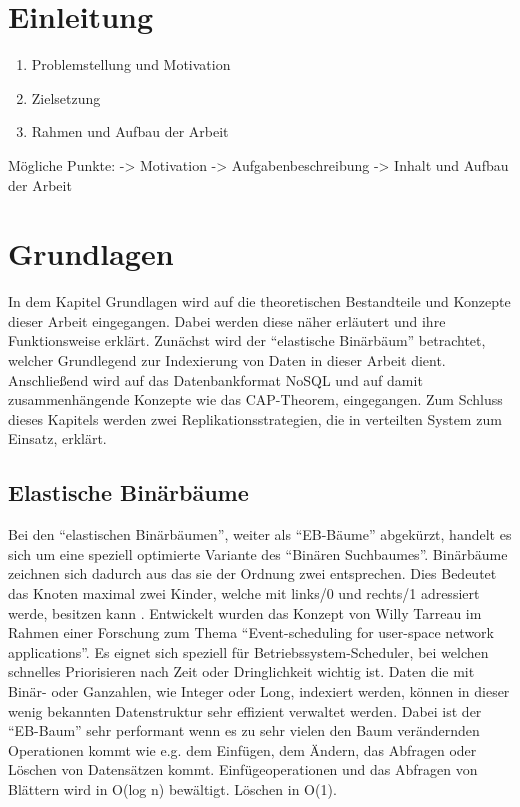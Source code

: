 \documentclass[a4paper,11pt,oneside,%
headsepline,												%
footsepline,												%
bibtotocnumbered									%
]{scrreprt}
\begin{document}
\chapter{Einleitung}
 		\begin{enumerate}[1.]
			\item  Problemstellung und Motivation
			\item Zielsetzung
			\item Rahmen und Aufbau der Arbeit
		\end{enumerate}
		
	Mögliche Punkte:
	-> Motivation
	-> Aufgabenbeschreibung
	-> Inhalt und Aufbau der Arbeit	
		
\chapter{Grundlagen}

In dem Kapitel Grundlagen wird auf die theoretischen Bestandteile und Konzepte dieser Arbeit eingegangen. Dabei werden diese näher erläutert und ihre Funktionsweise erklärt.
Zunächst wird der \enquote{elastische Binärbäum} betrachtet, welcher Grundlegend zur Indexierung von Daten in dieser Arbeit dient. Anschließend wird auf das Datenbankformat NoSQL und auf damit zusammenhängende Konzepte wie das CAP-Theorem, eingegangen. Zum Schluss dieses Kapitels werden zwei Replikationsstrategien, die in verteilten System zum Einsatz, erklärt.   

\section{Elastische Binärbäume}
\label{sec:ebTreeGrundlagen}
Bei den \enquote{elastischen Binärbäumen}, weiter als \enquote{EB-Bäume} abgekürzt, handelt es sich um eine speziell optimierte Variante des \enquote{Binären Suchbaumes}. Binärbäume zeichnen sich dadurch aus das sie der Ordnung zwei entsprechen. Dies Bedeutet das Knoten maximal zwei Kinder, welche mit links/0 und rechts/1 adressiert werde, besitzen kann \autocite[251]{Ottmann2002}.
 Entwickelt wurden das Konzept von Willy Tarreau \autocite{Tarreau} im Rahmen einer Forschung zum Thema \enquote{Event-scheduling for user-space network applications}. Es eignet sich speziell für Betriebssystem-Scheduler, bei welchen schnelles Priorisieren nach Zeit oder Dringlichkeit wichtig ist. Daten die mit Binär- oder Ganzahlen, wie Integer oder Long, indexiert werden, können in dieser wenig bekannten Datenstruktur sehr effizient verwaltet werden. Dabei ist der \enquote{EB-Baum} sehr performant wenn es zu sehr vielen den Baum verändernden Operationen kommt wie e.g. dem Einfügen, dem Ändern, das Abfragen oder Löschen  von Datensätzen kommt\autocite{Tarreau}.
Einfügeoperationen und das Abfragen von Blättern wird in O(log n) bewältigt. Löschen in O(1).\\
\end{document}

